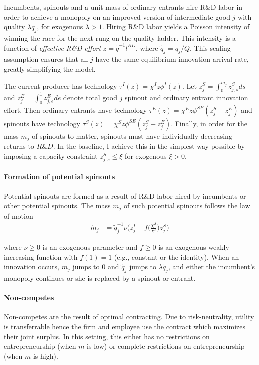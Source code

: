 \documentclass[11pt,english]{article}
\theoremstyle{remark}
\begin{document}
Incumbents, spinouts and a unit mass of ordinary entrants hire R\&D labor in order to achieve a monopoly on an improved version of intermediate good $j$ with quality $\lambda q_j$, for exogenous $\lambda > 1$. Hiring R\&D labor yields a Poisson intensity of winning the race for the next rung on the quality ladder. This intensity is a function of \textit{effective R\&D effort} $z = \tilde{q}^{-1} l^{RD}$, where $\tilde{q}_j = q_j/Q$. This scaling assumption ensures that all $j$ have the same equilibrium innovation arrival rate, greatly simplifying the model.

The current producer has technology $\tau^I(z) = \chi^I z \phi^I(z)$. Let $z^S_j = \int_0^{m_j} z^S_{j,s} ds$ and $z^E_j = \int_0^1 z^E_{j,e} de$ denote total good $j$ spinout and ordinary entrant innovation effort. Then ordinary entrants have technology $\tau^E(z) = \chi^E z \phi^{SE} (z^S_j + z^E_j)$ and spinouts have technology $\tau^S(z) = \chi^S z \phi^{SE} (z^S_j + z^E_j)$. Finally, in order for the mass $m_j$ of spinouts to matter, spinouts must have individually decreasing returns to $R\&D$. In the baseline, I achieve this in the simplest way possible by imposing a capacity constraint $z^S_{j,s} \le \xi$ for exogenous $\xi > 0$.

\paragraph{Formation of potential spinouts}

Potential spinouts are formed as a result of R\&D labor hired by incumbents or other potential spinouts. The mass $m_j$ of such potential spinouts follows the law of motion 
\begin{align*}
	\dot{m}_j &= \tilde{q}_j^{-1} \nu \big(z^I_j + f\Big(\frac{\chi^S}{\chi^I}\Big) z^S_j \big) 
\end{align*}

where $\nu \ge 0 $ is an exogenous parameter and $f \ge 0$ is an exogenous weakly increasing function with $f(1) = 1$ (e.g., constant or the identity). When an innovation occurs, $m_j$ jumps to $0$ and $\tilde{q}_j$ jumps to $\lambda \tilde{q}_j$, and either the incumbent's monopoly continues or she is replaced by a spinout or entrant.

\paragraph{Non-competes}

Non-competes are the result of optimal contracting. Due to risk-neutrality, utility is transferrable hence the firm and employee use the contract which maximizes their joint surplus. In this setting, this either has no restrictions on entrepreneurship (when $m$ is low) or complete restrictions on entrepreneurship (when $m$ is high). 
\end{document}
